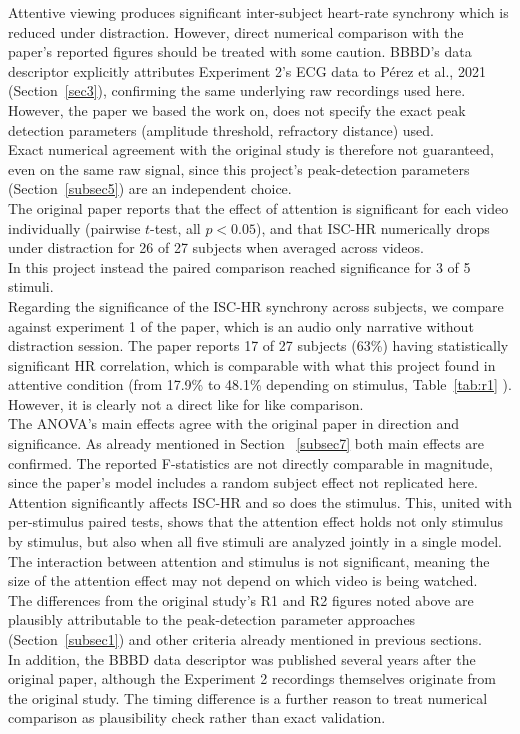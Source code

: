 \documentclass[pdflatex,sn-mathphys-num]{sn-jnl}%
\theoremstyle{thmstyleone}%
\theoremstyle{thmstyletwo}%
\theoremstyle{thmstylethree}%
\begin{document}
Attentive viewing produces significant inter-subject heart-rate synchrony which is reduced under distraction. However, direct numerical comparison with the paper's reported figures should be treated with some caution.
BBBD's data descriptor explicitly attributes Experiment 2's ECG data to Pérez et al., 2021~\cite{perez2021} (Section~\ref{sec3}), confirming the same underlying raw recordings used here.\\ However, the paper we based the work on, does not specify the exact peak detection parameters (amplitude threshold, refractory distance) used.\\
Exact numerical agreement with the original study is therefore not guaranteed, even on the same raw signal, since this project's peak-detection parameters (Section~\ref{subsec5}) are an independent choice.\\
The original paper reports that the effect of attention is significant for each video individually (pairwise $t$-test, all $p<0.05$), and that ISC-HR numerically drops under distraction for 26 of 27 subjects when averaged across videos.\\
In this project instead the paired comparison reached significance for 3 of 5 stimuli.\\
Regarding the significance of the ISC-HR synchrony across subjects, we compare against experiment 1 of the paper, which is an audio only narrative without distraction session. The paper reports 17 of 27 subjects (63\%) having statistically significant HR correlation, which is comparable with what this project found in attentive condition (from 17.9\% to 48.1\% depending on stimulus, Table~\ref{tab:r1} ). However, it is clearly not a direct like for like comparison.\\
The ANOVA's main effects agree with the original paper in direction and significance. As already mentioned in Section ~\ref{subsec7} both main effects are confirmed. The reported F-statistics are not directly comparable in magnitude, since the paper's model includes a random subject effect not replicated here.\\
Attention significantly affects ISC-HR and so does the stimulus. This, united with per-stimulus paired tests, shows that the attention effect holds not only stimulus by stimulus, but also when all five stimuli are analyzed jointly in a single model.\\
The interaction between attention and stimulus is not significant, meaning the size of the attention effect may not depend on which video is being watched.\\
The differences from the original study's R1 and R2 figures noted above are plausibly attributable to the peak-detection parameter approaches (Section~\ref{subsec1}) and other criteria already mentioned in previous sections.\\
In addition, the BBBD data descriptor was published several years after the original paper, although the Experiment 2 recordings themselves originate from the original study.
The timing difference is a further reason to treat numerical comparison as plausibility check rather than exact validation.
\end{document}
